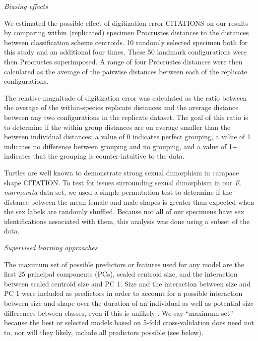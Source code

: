 \documentclass[12pt,letterpaper]{article}
\renewcommand{\subsection}[1]{%
\bigskip
\begin{center}
\begin{large}
\normalfont\itshape #1
\end{large}
\end{center}}
\begin{document}
\subsection{Biasing effects}
We estimated the possible effect of digitization error CITATIONS on our results by comparing within (replicated) specimen Procrustes distances to the distances between classification scheme centroids. 10 randomly selected specimen both for this study and an additional four times. These 50 landmark configurations were then Procrustes superimposed. A range of four Procrustes distances were then calculated as the average of the pairwise distances between each of the replicate configurations. 

The relative magnitude of digitization error was calculated as the ratio between the average of the within-species replicate distances and the average distance between any two configurations in the replicate dataset. The goal of this ratio is to determine if the within group distances are on average smaller than the between individual distances; a value of 0 indicates perfect grouping, a value of 1 indicates no difference between grouping and no grouping, and a value of 1+ indicates that the grouping is counter-intuitive to the data.

Turtles are well known to demonstrate strong sexual dimorphism in carapace shape CITATION. To test for issues surrounding sexual dimorphism in our \textit{E. marmorata} data set, we used a simple permutation test to determine if the distance between the mean female and male shapes is greater than expected when the sex labels are randomly shuffled. Because not all of our specimens have sex identifications associated with them, this analysis was done using a subset of the data.


\subsection{Supervised learning approaches}
The maximum set of possible predictors or features used for any model are the first 25 principal components (PCs), scaled centroid size, and the interaction between scaled centroid size and PC 1. Size and the interaction between size and PC 1 were included as predictors in order to account for a possible interaction between size and shape over the duration of an individual as well as potential size differences between classes, even if this is unlikely \citep{Seeliger1945,Holland1992}. We say ``maximum set'' because the best or selected models based on 5-fold cross-validation does need not to, nor will they likely, include all predictors possible (see below).
\end{document}
